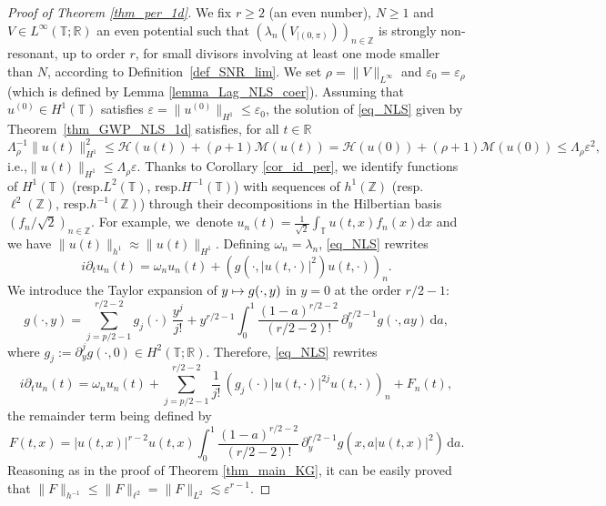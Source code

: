 \documentclass[11pt]{article}
\newcommand{\ie}{i.e.,\xspace}
\newcommand{\resp}{resp.\xspace}
\let\epsilon\varepsilon
\newcommand\mto{\mathchoice{\longmapsto}{\mapsto}{\mapsto}{\mapsto}}
\theoremstyle{definition}
\begin{document}
\begin{proof}[Proof of Theorem \ref{thm_per_1d}] We fix $r\geq 2$ (an even number), $N\geq 1$ and $V\in L^\infty(\mathbb{T};\mathbb{R})$ an even potential such that $(\lambda_n(V_{|(0,\pi)}))_{n\in \mathbb{Z}}$ is strongly non-resonant, up to order $r$, for small divisors involving at least one mode smaller than $N$, according to Definition~\ref{def_SNR_lim}. We set $\rho = \|V\|_{L^\infty}$ and $\epsilon_0 = \varepsilon_{\rho}$ (which is defined by Lemma \ref{lemma_Lag_NLS_coer}). Assuming that $u^{(0)}\in H^1(\mathbb{T})$ satisfies $\varepsilon = \| u^{(0)} \|_{H^1} \leq \epsilon_0$, the solution of \eqref{eq_NLS} given by Theorem~\ref{thm_GWP_NLS_1d} satisfies, for all $t\in \mathbb{R}$
\begin{equation}
\label{eq_glob_cont_norm}
\Lambda_\rho^{-1} \| u(t) \|_{H^1}^2 \leq \mathcal{H}(u(t))+ (\rho+1) \mathcal{M}(u(t)) = \mathcal{H}(u(0))+ (\rho+1) \mathcal{M}(u(0)) \leq \Lambda_\rho \varepsilon^2,
\end{equation}
\ie $\| u(t) \|_{H^1}\leq \Lambda_{\rho} \varepsilon$. Thanks to Corollary \ref{cor_id_per}, we identify functions of $H^1(\mathbb{T})$ (\resp $L^2(\mathbb{T})$, \resp $H^{-1}(\mathbb{T})$) with sequences of $h^1(\mathbb{Z})$ (\resp $\ell^2(\mathbb{Z})$, \resp $h^{-1}(\mathbb{Z})$) through their decompositions in the Hilbertian basis $(f_n/\sqrt{2})_{n\in \mathbb{Z}}$. For example, we~denote $u_n(t) = \frac1{\sqrt2} \int_\mathbb{T} u(t,x) f_n(x) \mathrm{d}x$ and we have $\| u(t) \|_{h^1} \approx \| u(t) \|_{H^1}$. Defining $\omega_n = \lambda_n$, \eqref{eq_NLS} rewrites
\[
i\partial_t u_n(t) = \omega_n u_n(t) + (g(\cdot,|u(t,\cdot)|^2) u(t,\cdot))_{n}.
\]
We introduce the Taylor expansion of $y\mto g(\cdot,y)$ in $y=0$ at the order $r/2-1$:
\[
g(\cdot,y) = \sum_{j=p/2-1}^{r/2-2} g_j(\cdot)\, \frac{y^j}{j !} + y^{r/2-1}\int_0^1 \frac{(1-a)^{r/2-2}}{(r/2-2) ! }\, \partial_y^{r/2-1} g(\cdot, a y) \, \mathrm{d}a,
\]
where $g_j:= \partial_y^j g(\cdot,0) \in H^2(\mathbb{T};\mathbb{R})$. Therefore, \eqref{eq_NLS} rewrites
\[
i\partial_t u_n(t) = \omega_n u_n(t) + \sum_{j=p/2-1}^{r/2-2} \frac1{j!}\, (g_j(\cdot) |u(t,\cdot)|^{2j}u(t,\cdot))_n + F_n(t),
\]
the remainder term being defined by
\[
F(t,x)=|u(t,x)|^{r-2}u(t,x) \int_0^1 \frac{(1-a)^{r/2-2}}{(r/2-2) ! }\, \partial_y^{r/2-1} g(x, a |u(t,x)|^{2}) \, \mathrm{d}a.
\]
Reasoning as in the proof of Theorem \ref{thm_main_KG}, it can be easily proved that $\| F\|_{h^{-1}} \leq \| F\|_{\ell^2} = \| F\|_{L^2} \lesssim \varepsilon^{r-1}$.


\end{proof}
\end{document}
